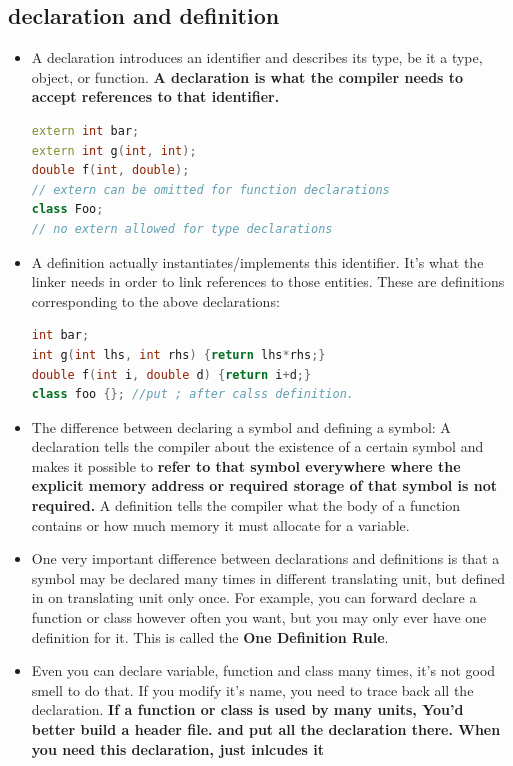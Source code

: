 \documentclass[a4paper,11pt,twoside]{book}
\begin{document}
\subsection{declaration and definition}
\begin{itemize}
	\item A declaration introduces an identifier and describes its type, be it a type, object, or function. \textbf{A declaration is what the compiler needs to accept references to that identifier.} 
	
\begin{lstlisting}[frame=single, language=c++]
extern int bar;
extern int g(int, int);
double f(int, double); 
// extern can be omitted for function declarations
class Foo; 
// no extern allowed for type declarations
	\end{lstlisting}
	
	\item A definition actually instantiates/implements this identifier. It's what the linker needs in order to link references to those entities. These are definitions corresponding to the above declarations:

\begin{lstlisting}[frame=single, language=c++]
int bar;
int g(int lhs, int rhs) {return lhs*rhs;}
double f(int i, double d) {return i+d;}
class foo {}; //put ; after calss definition.
\end{lstlisting}
	
	\item The difference between declaring a symbol and defining a symbol: A declaration tells the compiler about the existence of a certain symbol and makes it possible to \textbf{refer to that symbol everywhere where the explicit memory address or required storage of that symbol is not required.}  A definition tells the compiler what the body of a function contains or how much memory it must allocate for a variable.
	
	\item One very important difference between declarations and definitions is that a symbol may be declared many times in different translating unit, but defined in on translating unit only once. For example, you can forward declare a function or class however often you want, but you may only ever have one definition for it. This is called the \textbf{One Definition Rule}.
	
	\item Even you can declare variable, function and class many times, it's not good smell to do that.  If you modify it's name, you need to trace back all the declaration. \textbf{If a function or class is used by many units, You'd better build a header file. and put all the declaration there. When you need this declaration, just inlcudes it} 
\end{itemize}
\end{document}
